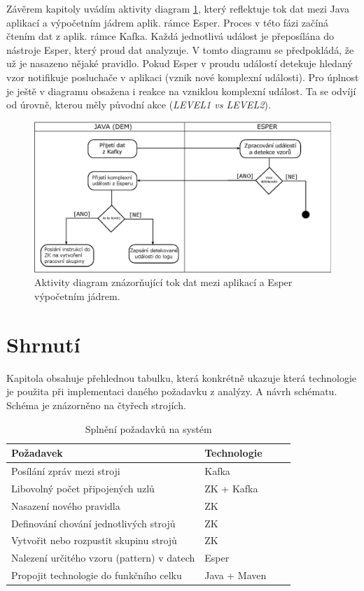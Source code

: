 \documentclass[
  digital, %
  table,   %
  nolof,     %
  nolot,     %
  oneside, %
  nocover,
  monochrome,
  12pt
]{fithesis3}
\begin{document}
Závěrem kapitoly uvádím aktivity diagram \ref{fig:esper_activity}, který reflektuje tok dat mezi Java aplikací a výpočetním jádrem aplik. rámce Esper. Proces v této fázi začíná čtením dat z aplik. rámce Kafka. Každá jednotlivá událost je přeposílána do nástroje Esper, který proud dat analyzuje. V tomto diagramu se předpokládá, že už je nasazeno nějaké pravidlo. Pokud Esper v proudu událostí detekuje hledaný vzor notifikuje posluchače v aplikaci (vznik nové komplexní události). Pro úplnost je ještě v diagramu obsažena i reakce na vzniklou komplexní událost. Ta se odvíjí od úrovně, kterou měly původní akce (\textit{LEVEL1 vs LEVEL2}).

\begin{figure}[H]
	\centering
    \includegraphics[width=.9\linewidth, height=.3\textheight]{images/esper-activity.eps}
    \caption{Aktivity diagram znázorňující tok dat mezi aplikací a Esper výpočetním jádrem.}
    \label{fig:esper_activity}
\end{figure}


\section{Shrnutí}
Kapitola obsahuje přehlednou tabulku, která konkrétně ukazuje která technologie je použita při implementaci daného požadavku z analýzy. A návrh schématu. Schéma je znázorněno na čtyřech strojích.

\begin{table}[H]
  \centering
  \begin{tabularx}{\textwidth}{lllX}
    \toprule
    Požadavek & Technologie \\
    \midrule
    Posílání zpráv mezi stroji & Kafka \\
    Libovolný počet připojených uzlů & ZK + Kafka \\
    Nasazení nového pravidla & ZK \\
    Definování chování jednotlivých strojů & ZK \\
    Vytvořit nebo rozpustit skupinu strojů & ZK \\
    Nalezení určitého vzoru (pattern) v datech & Esper \\
    Propojit technologie do funkčního celku & Java + Maven \\
    \bottomrule
  \end{tabularx}
  \caption{Splnění požadavků na systém}
  \label{tab:fulfill-usecases}
\end{table}
\end{document}
